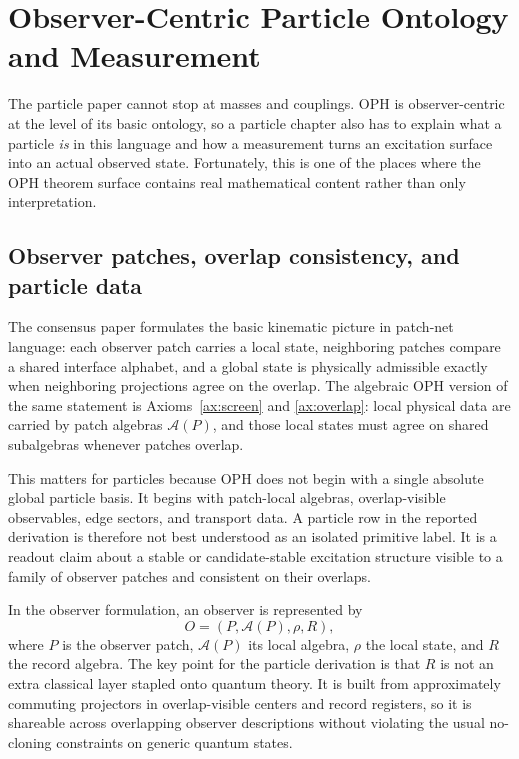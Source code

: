 \documentclass[11pt]{article}
\begin{document}
\section{Observer-Centric Particle Ontology and Measurement}

The particle paper cannot stop at masses and couplings. OPH is observer-centric at the level of
its basic ontology, so a particle chapter also has to explain what a particle \emph{is} in this
language and how a measurement turns an excitation surface into an actual observed state.
Fortunately, this is one of the places where the OPH theorem surface contains
real mathematical content rather than only interpretation.

\subsection{Observer patches, overlap consistency, and particle data}

The consensus paper formulates the basic kinematic picture in patch-net language: each observer
patch carries a local state, neighboring patches compare a shared interface alphabet, and a
global state is physically admissible exactly when neighboring projections agree on the overlap.
The algebraic OPH version of the same statement is Axioms~\ref{ax:screen} and
\ref{ax:overlap}: local physical data are carried by patch algebras \(\mathcal A(P)\), and those local
states must agree on shared subalgebras whenever patches overlap.

This matters for particles because OPH does not begin with a single absolute global particle
basis. It begins with patch-local algebras, overlap-visible observables, edge sectors, and
transport data. A particle row in the reported derivation is therefore not best
understood as an isolated primitive label. It is a readout claim about a stable or
candidate-stable excitation structure visible to a family of observer patches and consistent on
their overlaps.

In the observer formulation, an observer is represented by
\[
O=(P,\mathcal A(P),\rho,R),
\]
where \(P\) is the observer patch, \(\mathcal A(P)\) its local algebra, \(\rho\) the local
state, and \(R\) the record algebra. The key point for the particle derivation is that \(R\) is not
an extra classical layer stapled onto quantum theory. It is built from approximately commuting
projectors in overlap-visible centers and record registers, so it is shareable across overlapping
observer descriptions without violating the usual no-cloning constraints on generic quantum
states.
\end{document}
